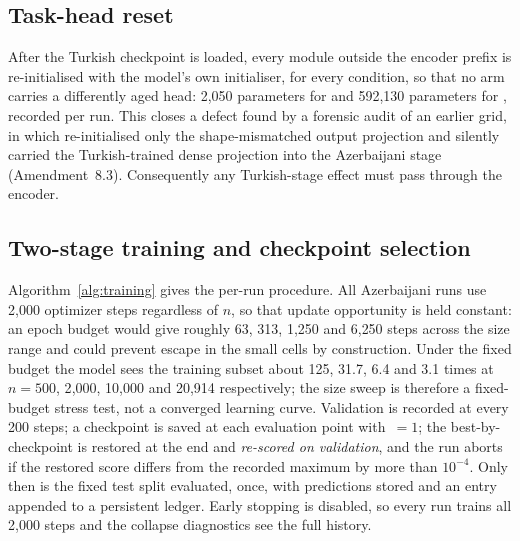 \subsection{Task-head reset}
\label{sec:method:head}
After the Turkish checkpoint is loaded, every module outside the encoder prefix is re-initialised with the model's own initialiser, for every condition, so that no arm carries a differently aged head: 2{,}050  parameters for \xlmxv{} and 592{,}130  parameters for \xlmr{}, recorded per run. This closes a defect found by a forensic audit of an earlier grid, in which  re-initialised only the shape-mismatched output projection and silently carried the Turkish-trained dense projection into the Azerbaijani stage (Amendment~8.3). Consequently any Turkish-stage effect must pass through the encoder.

\subsection{Two-stage training and checkpoint selection}
\label{sec:method:training}
Algorithm~\ref{alg:training} gives the per-run procedure. All Azerbaijani runs use 2{,}000 optimizer steps regardless of $n$, so that update opportunity is held constant: an epoch budget would give roughly 63, 313, 1{,}250 and 6{,}250 steps across the size range and could prevent escape in the small cells by construction. Under the fixed budget the model sees the training subset about 125, 31.7, 6.4 and 3.1 times at $n=500$, 2{,}000, 10{,}000 and 20{,}914 respectively; the size sweep is therefore a fixed-budget stress test, not a converged learning curve. Validation \Fone{} is recorded at every 200 steps; a checkpoint is saved at each evaluation point with \,$=1$; the best-by-\Fone{} checkpoint is restored at the end and \emph{re-scored on validation}, and the run aborts if the restored score differs from the recorded maximum by more than $10^{-4}$. Only then is the fixed test split evaluated, once, with predictions stored and an entry appended to a persistent ledger. Early stopping is disabled, so every run trains all 2{,}000 steps and the collapse diagnostics see the full history.


